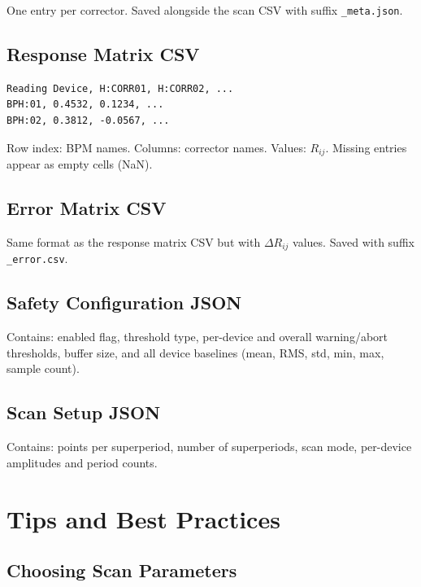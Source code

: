 \documentclass[11pt,a4paper,twoside]{report}
\begin{document}
One entry per corrector. Saved alongside the scan CSV with suffix \texttt{\_meta.json}.

\section{Response Matrix CSV}

\begin{lstlisting}
Reading Device, H:CORR01, H:CORR02, ...
BPH:01, 0.4532, 0.1234, ...
BPH:02, 0.3812, -0.0567, ...
\end{lstlisting}

Row index: BPM names. Columns: corrector names. Values: $R_{ij}$. Missing entries appear as empty cells (NaN).

\section{Error Matrix CSV}

Same format as the response matrix CSV but with $\Delta R_{ij}$ values. Saved with suffix \texttt{\_error.csv}.

\section{Safety Configuration JSON}

Contains: enabled flag, threshold type, per-device and overall warning/abort thresholds, buffer size, and all device baselines (mean, RMS, std, min, max, sample count).

\section{Scan Setup JSON}

Contains: points per superperiod, number of superperiods, scan mode, per-device amplitudes and period counts.


\chapter{Tips and Best Practices}\label{ch:tips}

\section{Choosing Scan Parameters}
\end{document}
